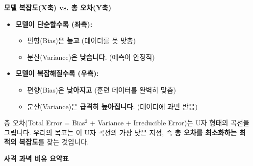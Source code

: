 \documentclass[11pt,a4paper]{book}
\theoremstyle{definition}
\begin{document}
\begin{tcolorbox}[title={⭐ 모델 복잡도에 따른 오차의 변화}]
\textbf{모델 복잡도(X축) vs. 총 오차(Y축)}

\begin{itemize}
    \item \textbf{모델이 단순할수록 (좌측):}
        \begin{itemize}
            \item 편향(Bias)은 \textbf{높고} (데이터를 못 맞춤)
            \item 분산(Variance)은 \textbf{낮습니다}. (예측이 안정적)
        \end{itemize}
    \item \textbf{모델이 복잡해질수록 (우측):}
        \begin{itemize}
            \item 편향(Bias)은 \textbf{낮아지고} (훈련 데이터를 완벽히 맞춤)
            \item 분산(Variance)은 \textbf{급격히 높아집니다}. (데이터에 과민 반응)
        \end{itemize}
\end{itemize}
총 오차(Total Error = Bias$^2$ + Variance + Irreducible Error)는 U자 형태의 곡선을 그립니다.
우리의 목표는 이 U자 곡선의 가장 낮은 지점, 즉 \textbf{총 오차를 최소화하는 최적의 복잡도}를 찾는 것입니다.
\end{tcolorbox}

\textbf{사격 과녁 비유 요약표}
\end{document}
